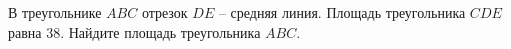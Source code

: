 \begin{ex}
	\begin{condition}
		В треугольнике \( ABC \) отрезок \( DE \) – средняя линия. Площадь треугольника \( CDE \) равна \( 38 \). Найдите площадь треугольника \( ABC \).
	\end{condition}
\end{ex}